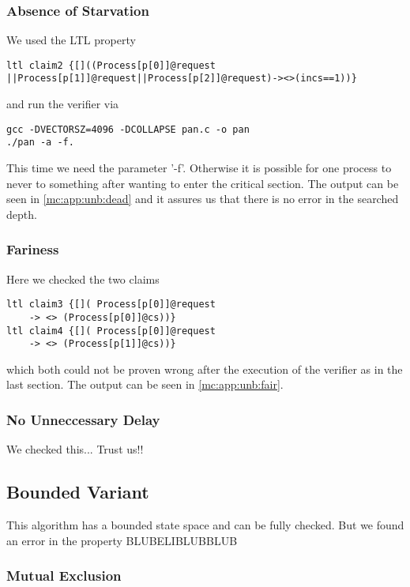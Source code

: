 \documentclass{llncs}
\begin{document}
\subsubsection{Absence of Starvation}

We used the LTL property
\begin{lstlisting}
ltl claim2 {[]((Process[p[0]]@request
||Process[p[1]]@request||Process[p[2]]@request)-><>(incs==1))}
\end{lstlisting}
and run the verifier via
\begin{lstlisting}
gcc -DVECTORSZ=4096 -DCOLLAPSE pan.c -o pan
./pan -a -f.
\end{lstlisting}
This time we need the parameter '-f'. Otherwise it is possible for one process to never to something after wanting to enter
the critical section. The output can be seen in \ref{mc:app:unb:dead} and it assures us that there is no error in
the searched depth.

\subsubsection{Fariness}

Here we checked the two claims

\begin{lstlisting}
ltl claim3 {[]( Process[p[0]]@request 
    -> <> (Process[p[0]]@cs))}
ltl claim4 {[]( Process[p[0]]@request 
    -> <> (Process[p[1]]@cs))}
\end{lstlisting}

which both could not be proven wrong after the execution of the verifier as in the last section.
The output can be seen in \ref{mc:app:unb:fair}.

\subsubsection{No Unneccessary Delay}

We checked this... Trust us!!

\subsection{Bounded Variant}

This algorithm has a bounded state space and can be fully checked.
But we found an error in the property BLUBELIBLUBBLUB

\subsubsection{Mutual Exclusion}
\end{document}
